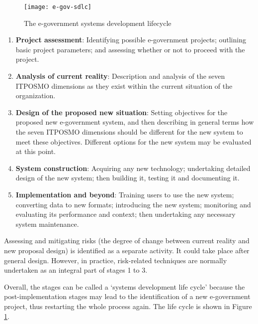 %
%
\begin{figure}[ht]
	\centering
	\texttt{[image: e-gov-sdlc]}
	\caption{The e-government systems development lifecycle} \label{fig:e-gov-sdlc}
\end{figure}

\begin{enumerate}
\item \textbf{Project assessment}: Identifying possible e-government projects; outlining basic project parameters; and assessing whether or not to proceed with the project.


\item \textbf{Analysis of current reality}: Description and analysis of the seven ITPOSMO
dimensions as they exist within the current situation of the organization.

\item \textbf{Design of the proposed new situation}:
Setting objectives for the proposed new
e-government system, and then describing in general terms how the seven
ITPOSMO dimensions should be different for the new system to meet these
objectives. Different options for the new
system may be evaluated at this point.

\item \textbf{System construction}: Acquiring any new
technology; undertaking detailed design
of the new system; then building it, testing it and documenting it.

\item \textbf{Implementation and beyond}: Training users
to use the new system; converting data
to new formats; introducing the new
system; monitoring and evaluating its
performance and context; then undertaking any necessary system maintenance.

\end{enumerate}


Assessing and mitigating risks (the degree of change between current reality and new
proposal design) is identified as a separate
activity. It could take place after general
design. However, in practice, risk-related
techniques are normally undertaken as an
integral part of stages 1 to 3.

Overall, the stages can be called a `systems development life cycle' because the post-implementation stages may lead to the identification of a new e-government project, thus restarting the whole process
again. The life cycle is shown in Figure \ref{fig:e-gov-sdlc}.

